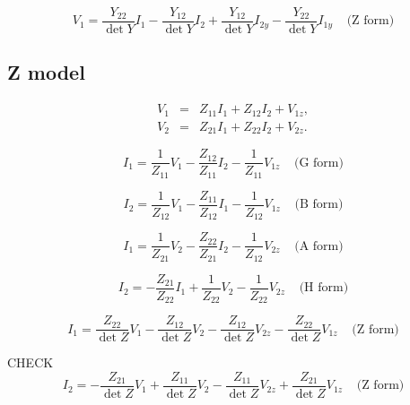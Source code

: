\documentclass[a4paper, 12pt]{article}
\newcommand{\bigspace}{\;\;\;\;}
\begin{document}
\begin{equation}
  V_1 = \frac{Y_{22}}{\det{Y}} I_1 - \frac{Y_{12}}{\det{Y}} I_2 + \frac{Y_{12}}{\det{Y}} I_{2y} - \frac{Y_{22}}{\det{Y}} I_{1y} \bigspace \mbox{(Z form)}
\end{equation}



\subsection{Z model}

\begin{eqnarray}
\label{eqn:ZV1}
  V_1 & = & Z_{11} I_1 + Z_{12} I_2 + V_{1z}, \\
  V_2 & = & Z_{21} I_1 + Z_{22} I_2 + V_{2z}.
\label{eqn:ZV2}
\end{eqnarray}



\begin{equation}
  I_1 = \frac{1}{Z_{11}} V_1 - \frac{Z_{12}}{Z_{11}} I_2 - \frac{1}{Z_{11}} V_{1z} \bigspace \mbox{(G form)}
\end{equation}

\begin{equation}
  I_2 = \frac{1}{Z_{12}} V_1 - \frac{Z_{11}}{Z_{12}} I_1 - \frac{1}{Z_{12}} V_{1z} \bigspace \mbox{(B form)}
\end{equation}

\begin{equation}
  I_1 = \frac{1}{Z_{21}} V_2 - \frac{Z_{22}}{Z_{21}} I_2 - \frac{1}{Z_{12}} V_{2z} \bigspace \mbox{(A form)}
\end{equation}


\begin{equation}
  I_2 = -\frac{Z_{21}}{Z_{22}} I_1 + \frac{1}{Z_{22}} V_2 - \frac{1}{Z_{22}} V_{2z} \bigspace \mbox{(H form)}
\end{equation}


\begin{equation}
  I_1 = \frac{Z_{22}}{\det{Z}} V_1 - \frac{Z_{12}}{\det{Z}} V_2 - \frac{Z_{12}}{\det{Z}} V_{2z} - \frac{Z_{22}}{\det{Z}} V_{1z} \bigspace \mbox{(Z form)}
\end{equation}

CHECK
\begin{equation}
  I_2 = -\frac{Z_{21}}{\det{Z}} V_1 + \frac{Z_{11}}{\det{Z}} V_2 - \frac{Z_{11}}{\det{Z}} V_{2z} + \frac{Z_{21}}{\det{Z}} V_{1z} \bigspace \mbox{(Z form)}
\end{equation}
\end{document}
